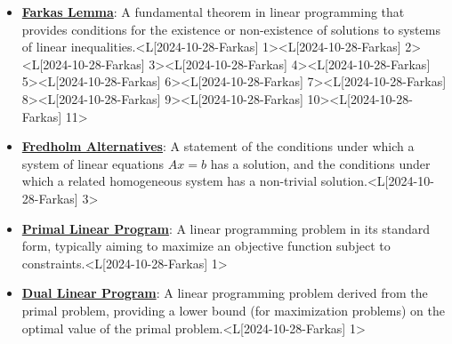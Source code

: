 \documentclass{article}%
\begin{document}
\begin{itemize}[[leftmargin=*]]%
\item \href{https://www.math.purdue.edu/~yipn/421/2024-10-28-Farkas.pdf#page=1}{\textbf{Farkas Lemma}}: A fundamental theorem in linear programming that provides conditions for the existence or non-existence of solutions to systems of linear inequalities.<L[2024-10-28-Farkas] 1><L[2024-10-28-Farkas] 2><L[2024-10-28-Farkas] 3><L[2024-10-28-Farkas] 4><L[2024-10-28-Farkas] 5><L[2024-10-28-Farkas] 6><L[2024-10-28-Farkas] 7><L[2024-10-28-Farkas] 8><L[2024-10-28-Farkas] 9><L[2024-10-28-Farkas] 10><L[2024-10-28-Farkas] 11>%
\item \href{https://www.math.purdue.edu/~yipn/421/2024-10-28-Farkas.pdf#page=3}{\textbf{Fredholm Alternatives}}: A statement of the conditions under which a system of linear equations $Ax = b$ has a solution, and the conditions under which a related homogeneous system has a non-trivial solution.<L[2024-10-28-Farkas] 3>%
\item \href{https://www.math.purdue.edu/~yipn/421/2024-10-28-Farkas.pdf#page=1}{\textbf{Primal Linear Program}}: A linear programming problem in its standard form, typically aiming to maximize an objective function subject to constraints.<L[2024-10-28-Farkas] 1>%
\item \href{https://www.math.purdue.edu/~yipn/421/2024-10-28-Farkas.pdf#page=1}{\textbf{Dual Linear Program}}: A linear programming problem derived from the primal problem, providing a lower bound (for maximization problems) on the optimal value of the primal problem.<L[2024-10-28-Farkas] 1>%
\end{itemize}%
\end{document}
